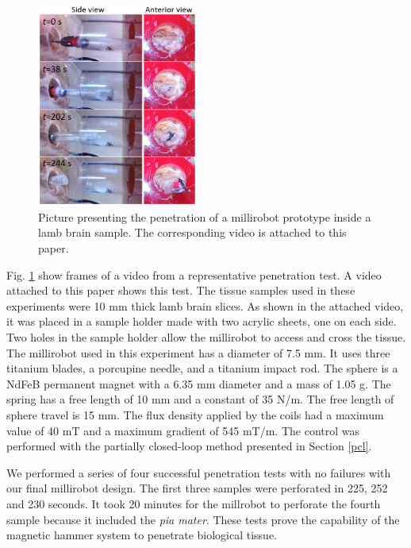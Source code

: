 \documentclass[letterpaper, 10 pt, conference]{ieeeconf}  %
\begin{document}
\begin{figure}
	\centering
  \includegraphics[width=150pt]{brain_penetration.png}
  \caption{Picture presenting the penetration of a millirobot prototype inside a lamb brain sample. The corresponding video is attached to this paper.}
  \label{brain_penetration}
	\vspace{-2em}
\end{figure}

Fig. \ref{brain_penetration} show frames of a video from a representative penetration test. A video attached to this paper shows this test. The tissue samples used in these experiments were 10 mm thick lamb brain slices. As shown in the attached video, it was placed in a sample holder made with two acrylic sheets, one on each side. Two holes in the sample holder allow the millirobot to access and cross the tissue. The millirobot used in this experiment has a diameter of 7.5 mm. It uses three titanium blades, a porcupine needle, and a titanium impact rod. The sphere is a NdFeB permanent magnet with a 6.35 mm diameter and a mass of 1.05 g. The spring has a free length of 10 mm and a constant of 35 N/m. The free length of sphere travel is 15 mm. The flux density applied by the coils had a maximum value of 40 mT and a maximum gradient of 545 mT/m. The control was performed with the partially closed-loop method presented in Section \ref{pcl}.\par
We performed a series of four successful penetration tests with no failures with our final millirobot design. The first three samples were perforated in 225, 252 and 230 seconds. It took 20 minutes for the millrobot to perforate the fourth sample because it included the \emph{pia mater}. These tests prove the capability of the magnetic hammer system to penetrate biological tissue.
\end{document}
